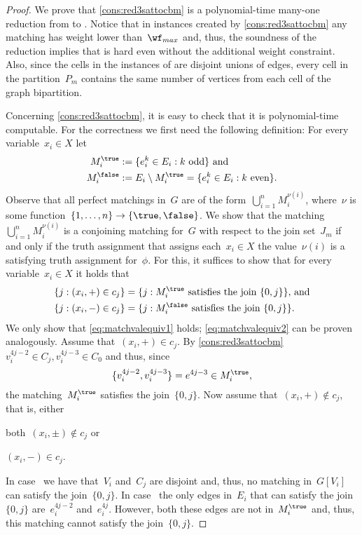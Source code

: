 \begin{proof}
  We prove that \autoref{cons:red3sattocbm} is a polynomial-time many-one reduction from \ptSATs{} to \pCBMs{}. Notice that in instances created by \autoref{cons:red3sattocbm} any matching has weight lower than~$\wf_{max}$ and, thus, the soundness of the reduction implies that \pCBMs{} is hard even without the additional weight constraint. Also, since the cells in the instances of \pCBMs{} are disjoint unions of edges, every cell in the partition~$P_m$ contains the same number of vertices from each cell of the graph bipartition. 

  Concerning \autoref{cons:red3sattocbm}, it is easy to check that it is polynomial-time computable. For the correctness we first need the following definition: For every variable~$x_i \in X$ let
\begin{align*}
  M^{\true}_i & := \{e^k_i  \in E_i: k \text{ odd}\} \text{ and} \\
  M^{\false}_i & := E_i \setminus M^{\true}_i = \{e^k_i \in E_i : k \text{ even}\}\text{.}
\end{align*}
Observe that all perfect matchings in~$G$ are of the form~$\bigcup_{i=1}^nM_i^{\nu(i)}$, where~$\nu$ is some function~$\{1, \ldots, n\} \rightarrow \{\true, \false\}$. We show that the matching~$\bigcup_{i=1}^nM_i^{\nu(i)}$ is a conjoining matching for~$G$ with respect to the join set~$J_m$ if and only if the truth assignment that assigns each~$x_i \in X$ the value~$\nu(i)$ is a satisfying truth assignment for~$\phi$. For this, it suffices to show that for every variable~$x_i \in X$ it holds that
\begin{align}
  \{j : (x_i, +) \in c_j\} &= \{j : M^{\true}_i \text{ satisfies the join } \{0, j\}\}\text{, and} \label{eq:matchvalequiv1}\\
  \{j : (x_i, -) \in c_j\} &= \{j : M^{\false}_i \text{ satisfies the join } \{0, j\}\}\text{.} \label{eq:matchvalequiv2}
\end{align}
We only show that \autoref{eq:matchvalequiv1} holds; \autoref{eq:matchvalequiv2} can be proven analogously. Assume that~$(x_i, +) \in c_j$. By \autoref{cons:red3sattocbm}~$v^{4j-2}_i \in C_j, v^{4j-3}_i \in C_0$ and thus, since \[\{v^{4j-2}_i, v^{4j-3}_i \} = e^{4j-3} \in M^{\true}_i\text{,}\] the matching~$M^{\true}_i$ satisfies the join~$\{0, j\}$. Now assume that~$(x_i, +) \notin c_j$, that is, either 
\begin{inparaenum}
\item both~$(x_i, \pm) \notin c_j$ \label{enu:mnph1} or
\item $(x_i, -) \in c_j$. \label{enu:mnph2}
\end{inparaenum}
In case~ we have that~$V_i$ and~$C_j$ are disjoint and, thus, no matching in~$G[V_i]$ can satisfy the join~$\{0, j\}$. In case~ the only edges in~$E_i$ that can satisfy the join~$\{0, j\}$ are~$e^{4j - 2}_i$ and~$e^{4j}_i$. However, both these edges are not in~$M^{\true}_i$ and, thus, this matching cannot satisfy the join~$\{0, j\}$.
\end{proof}
